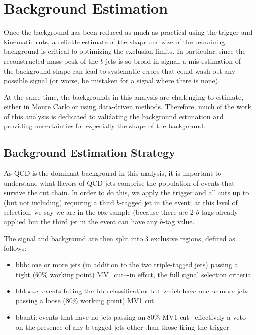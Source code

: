 

\chapter[Background Estimation]{Background Estimation}

Once the background has been reduced as much as practical using the trigger and kinematic cuts,
a reliable estimate of the shape and size of the remaining background is critical to optimizing
the exclusion limits.  In particular, since the reconstructed mass peak of the $b$-jets is so
broad in signal, a mis-estimation of the background shape can lead to systematic errors that
could wash out any possible signal (or worse, be mistaken for a signal where there is none).  

At the same time, the backgrounds in this analysis are challenging to estimate, either in Monte
Carlo or using data-driven methods.  Therefore, much of the work of this analysis is dedicated
to validating the background estimation and providing uncertainties for especially the shape 
of the background.  

\section{Background Estimation Strategy}
\label{sec:background_strategy}
As QCD is the dominant background in this analysis, it is important to understand
what flavors of QCD jets comprise the population of events that survive the cut
chain.  In order to do this, we apply the trigger and all cuts up to (but not including)
requiring a third $b$-tagged jet in the event; at this level of selection, we say
we are in the $bbx$ sample (because there are 2 $b$-tags already applied but the third
jet in the event can have any $b$-tag value.   

 The signal and background are then split into 3 exclusive regions, defined as follows:
\begin{itemize}
    \item bbb: one or more jets (in addition to the two triple-tagged jets) passing a tight (60\% working point)
 MV1 cut–-in effect, the full signal selection criteria
    \item bbloose: events failing the bbb classification but which have one or more jets passing a loose (80\%
 working point) MV1 cut
    \item bbanti: events that have no jets passing an 80\% MV1 cut-–effectively a veto on the presence of any
 b-tagged jets other than those firing the trigger
\end{itemize}


